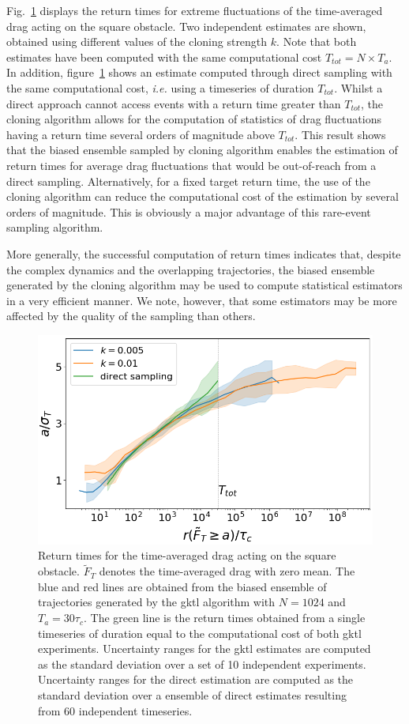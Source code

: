 \documentclass{jfm}
\begin{document}
Fig.~\ref{fig:return_times_gktl} displays the return times for extreme fluctuations of the time-averaged drag acting on the square obstacle.
Two independent estimates are shown, obtained using different values of the cloning strength $k$.
Note that both estimates have been computed with the same computational cost $T_{tot}=N\times T_a$.
In addition, figure~\ref{fig:return_times_gktl} shows an estimate computed through direct sampling with the same computational cost, \textit{i.e.} using a timeseries of duration $T_{tot}$.
Whilst a direct approach cannot access events with a return time greater than $T_{tot}$, the cloning algorithm allows for the computation of statistics of drag fluctuations having a return time several orders of magnitude above $T_{tot}$.
This result shows that the biased ensemble sampled by cloning algorithm enables the estimation of return times for average drag fluctuations that would be out-of-reach from a direct sampling.
Alternatively, for a fixed target return time, the use of the cloning algorithm can reduce the computational cost of the estimation by several orders of magnitude.
This is obviously a major advantage of this rare-event sampling algorithm. 

More generally, the successful computation of return times indicates that, despite the complex dynamics and the overlapping trajectories, the biased ensemble generated by the cloning algorithm may be used to compute statistical estimators in a very efficient manner.
We note, however, that some estimators may be more affected by the quality of the sampling than others.

\begin{figure}
	\centering
	\includegraphics[width=.7\linewidth]{return_times_GKTL/return_times_GKTL}
	\caption{\label{fig:return_times_gktl} Return times for the time-averaged drag acting on the square obstacle. $\tilde{F}_T$ denotes the time-averaged drag with zero mean. The blue and red lines are obtained from the biased ensemble of trajectories generated by the \ac{gktl} algorithm with $N=1024$ and $T_a=30\tau_c$. The green line is the return times obtained from a single timeseries of duration equal to the computational cost of both \ac{gktl} experiments. Uncertainty ranges for the \ac{gktl} estimates are computed as the standard deviation over a set of 10 independent experiments. Uncertainty ranges for the direct estimation are computed as the standard deviation over a ensemble of direct estimates resulting from 60 independent timeseries.}
\end{figure}
\end{document}
